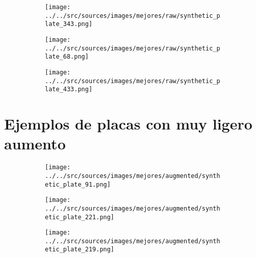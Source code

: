 \documentclass[12pt,a4paper]{article}
\begin{document}
\begin{figure}[H]
	\begin{subfigure}[h]{0.3\textwidth}
		\texttt{[image: ../../src/sources/images/mejores/raw/synthetic\_plate\_343.png]}
	\end{subfigure}

	\begin{subfigure}[h]{0.3\textwidth}
		\texttt{[image: ../../src/sources/images/mejores/raw/synthetic\_plate\_68.png]}
	\end{subfigure}

	\begin{subfigure}[h]{0.3\textwidth}
		\texttt{[image: ../../src/sources/images/mejores/raw/synthetic\_plate\_433.png]}
	\end{subfigure}
\end{figure}

\section{Ejemplos de placas con muy ligero aumento}

\begin{figure}[H]
	\begin{subfigure}[h]{0.3\textwidth}
		\texttt{[image: ../../src/sources/images/mejores/augmented/synthetic\_plate\_91.png]}
	\end{subfigure}

	\begin{subfigure}[h]{0.3\textwidth}
		\texttt{[image: ../../src/sources/images/mejores/augmented/synthetic\_plate\_221.png]}
	\end{subfigure}

	\begin{subfigure}[h]{0.3\textwidth}
		\texttt{[image: ../../src/sources/images/mejores/augmented/synthetic\_plate\_219.png]}
	\end{subfigure}
\end{figure}
\end{document}
